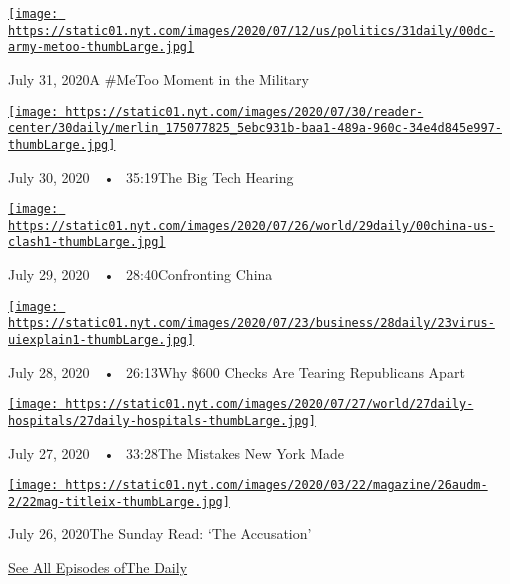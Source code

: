 \href{https://www.nytimes.com/2020/07/31/podcasts/the-daily/vanessa-guillen-military-metoo.html?action=click\&module=audio-series-bar\&region=header\&pgtype=Article}{\texttt{[image: https://static01.nyt.com/images/2020/07/12/us/politics/31daily/00dc-army-metoo-thumbLarge.jpg]}}

July 31, 2020A \#MeToo Moment in the Military

\href{https://www.nytimes.com/2020/07/30/podcasts/the-daily/congress-facebook-amazon-google-apple.html?action=click\&module=audio-series-bar\&region=header\&pgtype=Article}{\texttt{[image: https://static01.nyt.com/images/2020/07/30/reader-center/30daily/merlin\_175077825\_5ebc931b-baa1-489a-960c-34e4d845e997-thumbLarge.jpg]}}

July 30, 2020~~•~ 35:19The Big Tech Hearing

\href{https://www.nytimes.com/2020/07/29/podcasts/the-daily/china-trump-foreign-policy.html?action=click\&module=audio-series-bar\&region=header\&pgtype=Article}{\texttt{[image: https://static01.nyt.com/images/2020/07/26/world/29daily/00china-us-clash1-thumbLarge.jpg]}}

July 29, 2020~~•~ 28:40Confronting China

\href{https://www.nytimes.com/2020/07/28/podcasts/the-daily/unemployment-benefits-coronavirus.html?action=click\&module=audio-series-bar\&region=header\&pgtype=Article}{\texttt{[image: https://static01.nyt.com/images/2020/07/23/business/28daily/23virus-uiexplain1-thumbLarge.jpg]}}

July 28, 2020~~•~ 26:13Why \$600 Checks Are Tearing Republicans Apart

\href{https://www.nytimes.com/2020/07/27/podcasts/the-daily/new-york-hospitals-covid.html?action=click\&module=audio-series-bar\&region=header\&pgtype=Article}{\texttt{[image: https://static01.nyt.com/images/2020/07/27/world/27daily-hospitals/27daily-hospitals-thumbLarge.jpg]}}

July 27, 2020~~•~ 33:28The Mistakes New York Made

\href{https://www.nytimes.com/2020/07/26/podcasts/the-daily/the-accusation-the-sunday-read.html?action=click\&module=audio-series-bar\&region=header\&pgtype=Article}{\texttt{[image: https://static01.nyt.com/images/2020/03/22/magazine/26audm-2/22mag-titleix-thumbLarge.jpg]}}

July 26, 2020The Sunday Read: `The Accusation'

\href{https://www.nytimes.com/column/the-daily}{See All Episodes ofThe
Daily}


